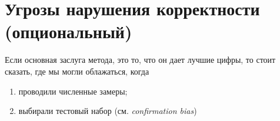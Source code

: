 
\section{Угрозы нарушения корректности (опциональный)}

Если основная заслуга метода, это то, что он дает лучшие цифры, то стоит сказать, где мы могли облажаться, когда
\begin{enumerate}
	\item проводили численные замеры;
	\item выбирали тестовый набор (см. \emph{confirmation bias})
\end{enumerate}
